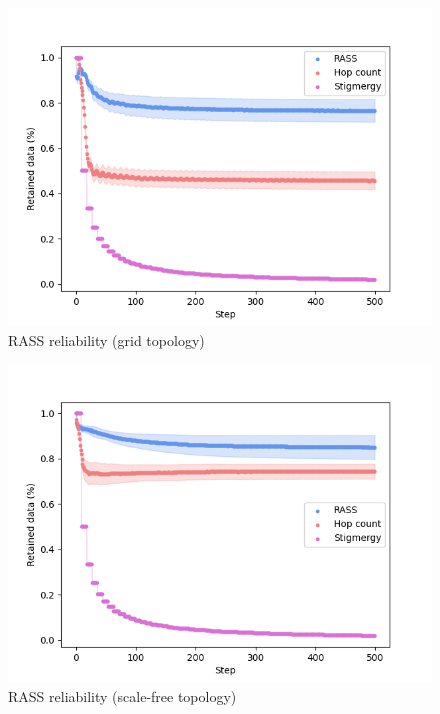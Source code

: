 \begin{figure}
    \includegraphics[width=16cm]{figures/dora_mesh/grid_reliability.png}
    \caption{RASS reliability (grid topology)}
    \label{results:grid_100_reliability}
\end{figure}

\begin{figure}
    \includegraphics[width=16cm]{figures/dora_mesh/scale_reliability.png}
        \caption{RASS reliability (scale-free topology)}
        \label{results:scale_100_reliability}
\end{figure}

